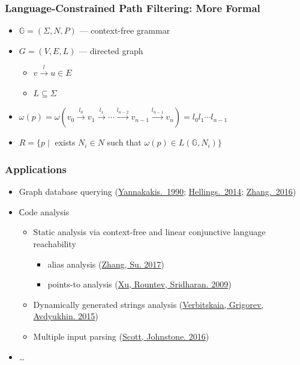 \documentclass[xcolor=table]{beamer}
\begin{document}
\begin{frame}[fragile]
  \transwipe[direction=90]
  \frametitle{Language-Constrained Path Filtering: More Formal}
  \begin{itemize}
    \item $\mathbb{G} = (\Sigma, N, P)$ --- context-free grammar
    \item $G = (V,E,L)$ --- directed graph
      \begin{itemize} 
        \item $v \xrightarrow{l} u \in E$
        \item $L\subseteq \Sigma$
      \end{itemize}
    \item $\omega(p) = \omega(v_0 \xrightarrow{l_0} v_1 \xrightarrow{l_1} \cdots \xrightarrow{l_{n-2}} v_{n-1} \xrightarrow{l_{n-1}} v_n) = l_0 l_1 \cdots l_{n-1}$
    \item $R = \{ p \mid $ exists $ N_i \in N $ such that $ \omega(p) \in L(\mathbb{G},N_i)\}$
  \end{itemize}
\end{frame}

\begin{frame}[fragile]
  \transwipe[direction=90]
  \frametitle{Applications}
  \begin{itemize}
    \item Graph database querying (\href{http://dl.acm.org/citation.cfm?id=298576}{Yannakakis.~1990}; \href{https://uhdspace.uhasselt.be/dspace/handle/1942/16709}{Hellings.~2014}; \href{https://link.springer.com/chapter/10.1007/978-3-319-46523-4_38}{Zhang.~2016})
    \item Сode analysis
    \begin{itemize}
      \item Static analysis via context-free and linear conjunctive language reachability
        \begin{itemize}
          \item alias analysis (\href{https://dl.acm.org/citation.cfm?id=3009848}{Zhang, Su. 2017})
          \item points-to analysis (\href{https://link.springer.com/chapter/10.1007/978-3-642-03013-0_6}{Xu, Rountev, Sridharan. 2009})
        \end{itemize}
      \item Dynamically generated strings analysis (\href{https://link.springer.com/chapter/10.1007/978-3-319-41579-6\_22}{Verbitskaia, Grigorev, Avdyukhin. 2015})
      \item Multiple input parsing (\href{https://2016.splashcon.org/event/parsing2016-multiple-input-gll-parsing}{Scott, Johnstone. 2016})
    \end{itemize}
    \item \dots
  \end{itemize}
\end{frame}
\end{document}
